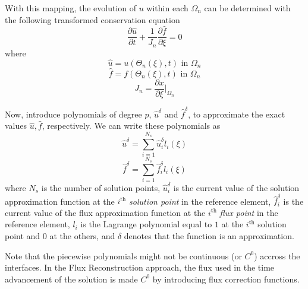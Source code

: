 With this mapping, the evolution of $u$ within each $\Omega_n$ can be determined with the following 
transformed conservation equation
\begin{equation}
\frac{\partial \hat{u}}{\partial t} + \frac{1}{J_n}\frac{\partial \hat{f}}{\partial \xi} = 0
\end{equation}
where
\begin{equation}
\hat{u} = u(\Theta_n(\xi),t) \text{ in } \Omega_n
\end{equation}
\begin{equation}
\hat{f} = f(\Theta_n(\xi),t) \text{ in } \Omega_n
\end{equation}
\begin{equation}
J_n = \frac{\partial x}{\partial \xi} \bigg|_{\Omega_n}
\end{equation}

Now, introduce polynomials of degree $p$, $\hat{u}^\delta$ and $\hat{f}^\delta$, to 
approximate the exact values $\hat{u},\hat{f}$, respectively. We can write these polynomials as
\begin{equation}
\hat{u}^\delta = \sum_{i=1}^{N_s} \hat{u}_i^\delta l_i(\xi)
\end{equation}
\begin{equation}
\hat{f}^\delta = \sum_{i=1}^{N_s} \hat{f}_i^\delta l_i(\xi)
\end{equation}
where $N_s$ is the number of solution points, $\hat{u}_i^\delta$ is the current value of the 
solution approximation function at the $i^\text{th}$ \emph{solution point} in the reference element, 
$\hat{f}_i^\delta$ is the current value of the flux approximation function at the $i^\text{th}$ 
\emph{flux point} in the reference element, $l_i$ is the Lagrange polynomial equal to $1$ at the 
$i^\text{th}$ solution point and $0$ at the others, and $\delta$ denotes that the function is an 
approximation.

Note that the piecewise polynomials might not be continuous (or $C^0$) accross the interfaces. In the 
Flux Reconstruction approach, the flux used in the time advancement of the solution is made $C^0$ 
by introducing flux correction functions.

